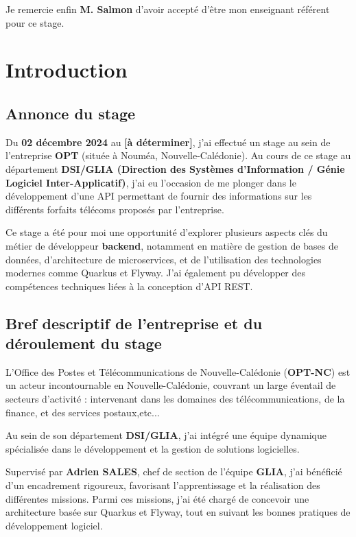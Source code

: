 \documentclass[11pt]{article}
\begin{document}
		Je remercie enfin \textbf{M. Salmon} d’avoir accepté d’être mon enseignant référent pour ce stage.
	
		\newpage
		\tableofcontents
		\newpage
		\section{Introduction}
		
		\subsection{Annonce du stage}
		
		Du \textbf{02 décembre 2024} au \textbf{[à déterminer]}, j’ai effectué un stage au sein de l’entreprise \textbf{OPT} (située à Nouméa, Nouvelle-Calédonie). Au cours de ce stage au département \textbf{DSI/GLIA (Direction des Systèmes d'Information / Génie Logiciel Inter-Applicatif)}, j’ai eu l’occasion de me plonger dans le développement d’une API permettant de fournir des informations sur les différents forfaits télécoms proposés par l’entreprise.
		
		Ce stage a été pour moi une opportunité d’explorer plusieurs aspects clés du métier de développeur \textbf{backend}, notamment en matière de gestion de bases de données, d’architecture de microservices, et de l’utilisation des technologies modernes comme Quarkus et Flyway. J’ai également pu développer des compétences techniques liées à la conception d’API REST.
		
		\subsection{Bref descriptif de l’entreprise et du déroulement du stage}
		
		L’Office des Postes et Télécommunications de Nouvelle-Calédonie (\textbf{OPT-NC}) est un acteur incontournable en Nouvelle-Calédonie, couvrant un large éventail de secteurs d'activité : intervenant dans les domaines des télécommunications, de la finance, et des services postaux,etc...
		
		Au sein de son département \textbf{DSI/GLIA}, j’ai intégré une équipe dynamique spécialisée dans le développement et la gestion de solutions logicielles.
		
		
		Supervisé par \textbf{Adrien SALES}, chef de section de l’équipe \textbf{GLIA}, j’ai bénéficié d’un encadrement rigoureux, favorisant l’apprentissage et la réalisation des différentes missions. Parmi ces missions, j’ai été chargé de concevoir une architecture basée sur Quarkus et Flyway, tout en suivant les bonnes pratiques de développement logiciel.
		
\end{document}
